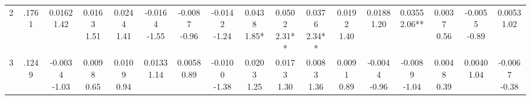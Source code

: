 \begin{landscape}
\begin{center}
{\begin{adjustbox}{max width=\textheight}
\begin{tabular}{lcccccccccccccccc}
2 & .1761 & \shortstack{0.0162\\1.42} & \shortstack{0.0163\\1.51} & \shortstack{0.0244\\1.41} & \shortstack{-0.0164\\-1.55} & \shortstack{-0.0087\\-0.96} & \shortstack{-0.0142\\-1.24} & \shortstack{0.0438\\1.85*} & \shortstack{0.0502\\2.31**} & \shortstack{0.0376\\2.34**} & \shortstack{0.0192\\1.40} & \shortstack{0.0188\\1.20} & \shortstack{0.0355\\2.06**} & \shortstack{0.0037\\0.56} & \shortstack{-0.0055\\-0.89} & \shortstack{0.0053\\1.02} \\
3 & .1249 & \shortstack{-0.0034\\-1.03} & \shortstack{0.0098\\0.65} & \shortstack{0.0109\\0.94} & \shortstack{0.0133\\1.14} & \shortstack{0.0058\\0.89} & \shortstack{-0.0100\\-1.38} & \shortstack{0.0203\\1.25} & \shortstack{0.0173\\1.30} & \shortstack{0.0083\\1.36} & \shortstack{0.0091\\0.89} & \shortstack{-0.0044\\-0.96} & \shortstack{-0.0089\\-1.04} & \shortstack{0.0048\\0.39} & \shortstack{0.0040\\1.04} & \shortstack{-0.0067\\-0.38} \\

\end{tabular}
\end{adjustbox}}
\end{center}
\end{landscape}
